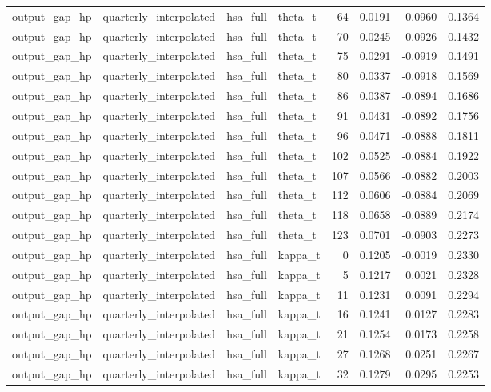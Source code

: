 \begin{tabular}{llllrrrr}
output\_gap\_hp & quarterly\_interpolated & hsa\_full & theta\_t & 64 & 0.0191 & -0.0960 & 0.1364 \\
output\_gap\_hp & quarterly\_interpolated & hsa\_full & theta\_t & 70 & 0.0245 & -0.0926 & 0.1432 \\
output\_gap\_hp & quarterly\_interpolated & hsa\_full & theta\_t & 75 & 0.0291 & -0.0919 & 0.1491 \\
output\_gap\_hp & quarterly\_interpolated & hsa\_full & theta\_t & 80 & 0.0337 & -0.0918 & 0.1569 \\
output\_gap\_hp & quarterly\_interpolated & hsa\_full & theta\_t & 86 & 0.0387 & -0.0894 & 0.1686 \\
output\_gap\_hp & quarterly\_interpolated & hsa\_full & theta\_t & 91 & 0.0431 & -0.0892 & 0.1756 \\
output\_gap\_hp & quarterly\_interpolated & hsa\_full & theta\_t & 96 & 0.0471 & -0.0888 & 0.1811 \\
output\_gap\_hp & quarterly\_interpolated & hsa\_full & theta\_t & 102 & 0.0525 & -0.0884 & 0.1922 \\
output\_gap\_hp & quarterly\_interpolated & hsa\_full & theta\_t & 107 & 0.0566 & -0.0882 & 0.2003 \\
output\_gap\_hp & quarterly\_interpolated & hsa\_full & theta\_t & 112 & 0.0606 & -0.0884 & 0.2069 \\
output\_gap\_hp & quarterly\_interpolated & hsa\_full & theta\_t & 118 & 0.0658 & -0.0889 & 0.2174 \\
output\_gap\_hp & quarterly\_interpolated & hsa\_full & theta\_t & 123 & 0.0701 & -0.0903 & 0.2273 \\
output\_gap\_hp & quarterly\_interpolated & hsa\_full & kappa\_t & 0 & 0.1205 & -0.0019 & 0.2330 \\
output\_gap\_hp & quarterly\_interpolated & hsa\_full & kappa\_t & 5 & 0.1217 & 0.0021 & 0.2328 \\
output\_gap\_hp & quarterly\_interpolated & hsa\_full & kappa\_t & 11 & 0.1231 & 0.0091 & 0.2294 \\
output\_gap\_hp & quarterly\_interpolated & hsa\_full & kappa\_t & 16 & 0.1241 & 0.0127 & 0.2283 \\
output\_gap\_hp & quarterly\_interpolated & hsa\_full & kappa\_t & 21 & 0.1254 & 0.0173 & 0.2258 \\
output\_gap\_hp & quarterly\_interpolated & hsa\_full & kappa\_t & 27 & 0.1268 & 0.0251 & 0.2267 \\
output\_gap\_hp & quarterly\_interpolated & hsa\_full & kappa\_t & 32 & 0.1279 & 0.0295 & 0.2253 \\

\end{tabular}
